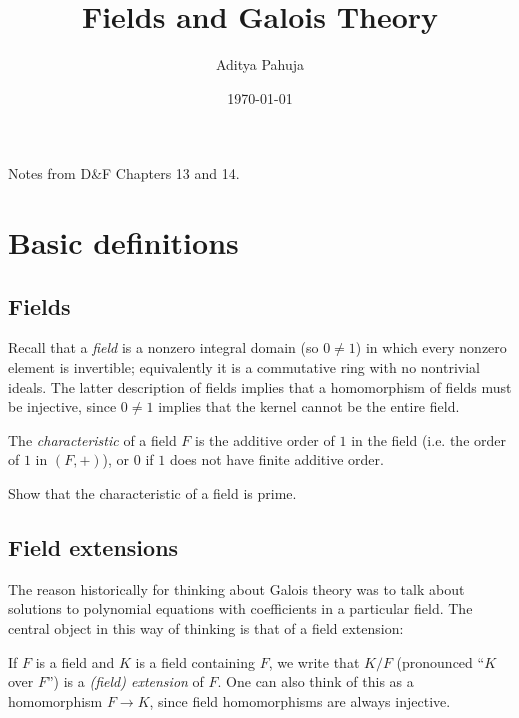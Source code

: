 \documentclass[10pt]{article}
\title{\vspace{-2.0cm}Fields and Galois Theory}
\author{\large Aditya Pahuja}
\date{\large \today}
\providecommand{\vocab}[1]{{{\sffamily\textit{#1}}}}
\begin{document}
\maketitle
\tableofcontents
\pagebreak

Notes from D\&F Chapters 13 and 14.

\section{Basic definitions}
\subsection{Fields}
Recall that a \vocab{field} is a nonzero integral domain (so $0\ne 1$)
in which every nonzero element is invertible;
equivalently it is a commutative ring with no nontrivial ideals.
The latter description of fields implies that
a homomorphism of fields must be injective,
since $0\ne 1$ implies that the kernel cannot be the entire field.

\begin{definition}
    \label{def:characteristic}
    The \vocab{characteristic} of a field $F$
    is the additive order of $1$ in the field
    (i.e. the order of $1$ in $(F,+)$),
    or $0$ if $1$ does not have finite additive order.
\end{definition}

\begin{exercise}
    \label{exer:characteristic-is-prime}
    Show that the characteristic of a field is prime.
\end{exercise}


\subsection{Field extensions}
The reason historically for thinking about Galois theory
was to talk about solutions to polynomial equations
with coefficients in a particular field.
The central object in this way of thinking is that of a field extension:
\begin{definition}
    \label{def:field-extension}
    If $F$ is a field and $K$ is a field containing $F$,
    we write that $K/F$ (pronounced ``$K$ over $F$'')
    is a \vocab{(field) extension} of $F$.
    One can also think of this as a homomorphism $F\to K$,
    since field homomorphisms are always injective.
\end{definition}
\end{document}
